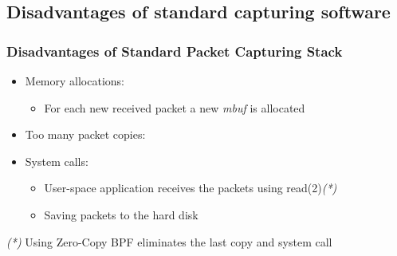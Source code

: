 \subsection*{Disadvantages of standard capturing software}
\begin{frame}
\frametitle{Disadvantages of Standard Packet Capturing Stack}
\begin{itemize}
	\item<2-> Memory allocations:
		\begin{itemize}
			\item<2-> For each new received packet a new \emph{mbuf} 
				is allocated\newline
		\end{itemize}


	\item<3-> Too many packet copies:
		\begin{itemize}
		\end{itemize}

	\item<4-> System calls:
		\begin{itemize}
			\item<4-> User-space application receives the packets using read(2)\emph{(*)}
			\item<4-> Saving packets to the hard disk\newline
		\end{itemize}

\end{itemize}
\begin{tiny}
\emph{(*)} Using Zero-Copy BPF eliminates the last copy and system call
\end{tiny}
\end{frame}
